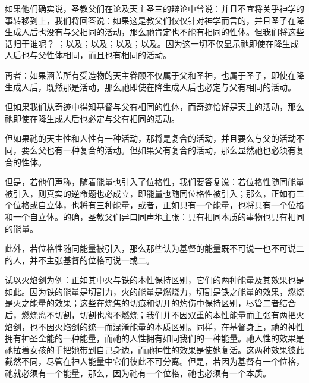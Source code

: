 如果他们确实说，圣教父们在论及天主圣三的辩论中曾说：并且不宜将关乎神学的事转移到上，我们将回答说：如果这是教父们仅仅针对神学而言的，并且圣子在降生成人后也没有与父相同的活动，那么祂肯定也不能有相同的性体。但我们将这些话归于谁呢？ ；以及；以及；以及；以及。因为这一切不仅显示祂即使在降生成人后也与父性体相同，而且也有相同的活动。\par

再者：如果涵盖所有受造物的天主眷顾不仅属于父和圣神，也属于圣子，即使在降生成人后，既然那是活动，那么祂即使在降生成人后也必定与父有相同的活动。\par

但如果我们从奇迹中得知基督与父有相同的性体，而奇迹恰好是天主的活动，那么祂即使在降生成人后也必定与父有相同的活动。\par

但如果祂的天主性和人性有一种活动，那将是复合的活动，并且要么与父的活动不同，要么父也有一种复合的活动。但如果父有复合的活动，那么显然祂也必须有复合的性体。\par

但是，若他们声称，随着能量也引入了位格性，我们要答复说：若位格性随同能量被引入，则真实的逆命题也必成立，即能量也随同位格性被引入；那么，正如有三个位格或自立体，也将有三种能量，或者，正如只有一个能量，也将只有一个位格和一个自立体。的确，圣教父们异口同声地主张：具有相同本质的事物也具有相同的能量。\par

此外，若位格性随同能量被引入，那么那些认为基督的能量既不可说一也不可说二的人，并不主张基督的位格可说一或二。\par

试以火焰剑为例：正如其中火与铁的本性保持区别，它们的两种能量及其效果也是如此。因为铁的能量是切割力，火的能量是燃烧力，切割是铁之能量的效果，燃烧是火之能量的效果；这些在烧焦的切痕和切开的灼伤中保持区别，尽管二者结合后，燃烧离不切割，切割也离不燃烧；我们并不因双重的本性能量而主张有两把火焰剑，也不因火焰剑的统一而混淆能量的本质区别。同样，在基督身上，祂的神性拥有神圣全能的一种能量，而祂的人性拥有如同我们的一种能量。祂人性的效果是祂拉着女孩的手把她带到自己身边，而祂神性的效果是使她复活。这两种效果彼此截然不同，尽管在神人能量中它们彼此不可分离。但是，若因为基督有一个位格，祂就必须有一个能量，那么，因为祂有一个位格，祂也必须有一个本质。\par

